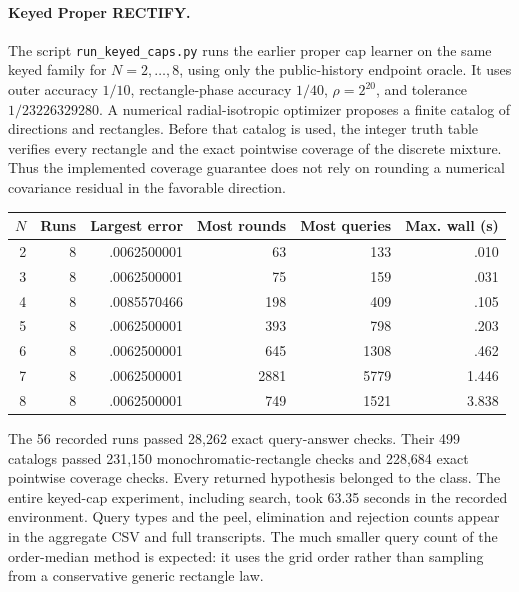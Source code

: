 \documentclass[11pt]{article}
\newcommand{\1}{\mathbf 1}
\begin{document}
\paragraph{Keyed Proper RECTIFY.}
The script \texttt{run\_keyed\_caps.py} runs the earlier proper cap learner on the same keyed family for $N=2,\ldots,8$, using only the public-history endpoint oracle. It uses outer accuracy $1/10$, rectangle-phase accuracy $1/40$, $\rho=2^{20}$, and tolerance $1/23226329280$. A numerical radial-isotropic optimizer proposes a finite catalog of directions and rectangles. Before that catalog is used, the integer truth table verifies every rectangle and the exact pointwise coverage of the discrete mixture. Thus the implemented coverage guarantee does not rely on rounding a numerical covariance residual in the favorable direction.

\begin{center}\small
\begin{tabular}{rrrrrr}
\toprule
$N$&Runs&Largest error&Most rounds&Most queries&Max. wall (s)\\
\midrule
2&8&.0062500001&63&133&.010\\
3&8&.0062500001&75&159&.031\\
4&8&.0085570466&198&409&.105\\
5&8&.0062500001&393&798&.203\\
6&8&.0062500001&645&1308&.462\\
7&8&.0062500001&2881&5779&1.446\\
8&8&.0062500001&749&1521&3.838\\
\bottomrule
\end{tabular}
\end{center}
The 56 recorded runs passed 28,262 exact query-answer checks. Their 499 catalogs passed 231,150 monochromatic-rectangle checks and 228,684 exact pointwise coverage checks. Every returned hypothesis belonged to the class. The entire keyed-cap experiment, including search, took 63.35 seconds in the recorded environment. Query types and the peel, elimination and rejection counts appear in the aggregate CSV and full transcripts. The much smaller query count of the order-median method is expected: it uses the grid order rather than sampling from a conservative generic rectangle law.
\end{document}
